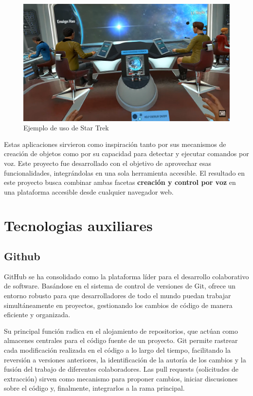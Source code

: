 \documentclass[a4paper, 12pt]{book}
\let\cleardoublepage\clearpage
\begin{document}
\begin{figure}[H]  %
  \centering
  \includegraphics[width=0.8\linewidth]{img/startrek.png}  %
  \caption{Ejemplo de uso de Star Trek}  %
  \label{fig:startrek}  %
\end{figure}

Estas aplicaciones sirvieron como inspiración tanto por sus mecanismos de creación de objetos como por su capacidad para detectar y ejecutar comandos por voz. 
Este proyecto fue desarrollado con el objetivo de aprovechar esas funcionalidades, integrándolas en una sola herramienta accesible. 
El resultado en este proyecto busca combinar ambas facetas \textbf{creación y control por voz} en una plataforma accesible desde cualquier navegador web.

\cleardoublepage
\section{Tecnologias auxiliares} 
\subsection{Github}
GitHub se ha consolidado como la plataforma líder para el desarrollo colaborativo de software. 
Basándose en el sistema de control de versiones de Git, ofrece un entorno robusto para que desarrolladores de todo el mundo puedan trabajar simultáneamente en proyectos, gestionando los cambios de código de manera eficiente y organizada.

Su principal función radica en el alojamiento de repositorios, que actúan como almacenes centrales para el código fuente de un proyecto. Git permite rastrear cada modificación realizada en el código a lo largo del tiempo, facilitando la reversión a versiones anteriores, la identificación de la autoría de los cambios y la fusión del trabajo de diferentes colaboradores.
Las pull requests (solicitudes de extracción) sirven como mecanismo para proponer cambios, iniciar discusiones sobre el código y, finalmente, integrarlos a la rama principal.
\end{document}
